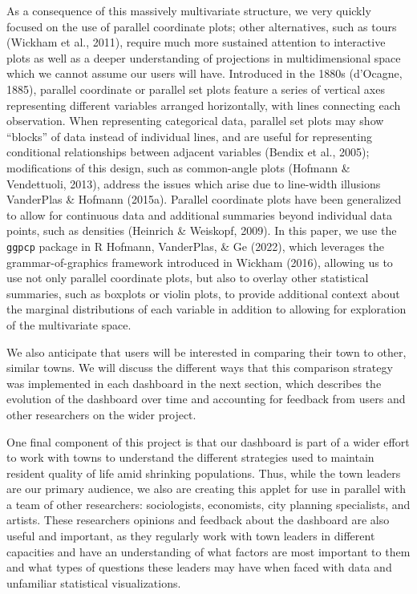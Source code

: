 \documentclass[print]{nuthesis}
\begin{document}
As a consequence of this massively multivariate structure, we very quickly focused on the use of parallel coordinate plots; other alternatives, such as tours (Wickham et al., 2011), require much more sustained attention to interactive plots as well as a deeper understanding of projections in multidimensional space which we cannot assume our users will have. Introduced in the 1880s (d'Ocagne, 1885), parallel coordinate or parallel set plots feature a series of vertical axes representing different variables arranged horizontally, with lines connecting each observation. When representing categorical data, parallel set plots may show ``blocks'' of data instead of individual lines, and are useful for representing conditional relationships between adjacent variables (Bendix et al., 2005); modifications of this design, such as common-angle plots (Hofmann \& Vendettuoli, 2013), address the issues which arise due to line-width illusions VanderPlas \& Hofmann (2015a). Parallel coordinate plots have been generalized to allow for continuous data and additional summaries beyond individual data points, such as densities (Heinrich \& Weiskopf, 2009). In this paper, we use the \texttt{ggpcp} package in R Hofmann, VanderPlas, \& Ge (2022), which leverages the grammar-of-graphics framework introduced in Wickham (2016), allowing us to use not only parallel coordinate plots, but also to overlay other statistical summaries, such as boxplots or violin plots, to provide additional context about the marginal distributions of each variable in addition to allowing for exploration of the multivariate space.

We also anticipate that users will be interested in comparing their town to other, similar towns. We will discuss the different ways that this comparison strategy was implemented in each dashboard in the next section, which describes the evolution of the dashboard over time and accounting for feedback from users and other researchers on the wider project.

One final component of this project is that our dashboard is part of a wider effort to work with towns to understand the different strategies used to maintain resident quality of life amid shrinking populations. Thus, while the town leaders are our primary audience, we also are creating this applet for use in parallel with a team of other researchers: sociologists, economists, city planning specialists, and artists. These researchers opinions and feedback about the dashboard are also useful and important, as they regularly work with town leaders in different capacities and have an understanding of what factors are most important to them and what types of questions these leaders may have when faced with data and unfamiliar statistical visualizations.
\end{document}

